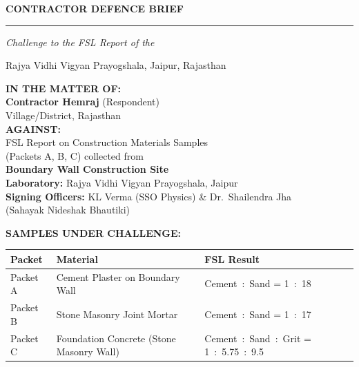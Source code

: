 \documentclass[12pt, a4paper]{article}
\begin{document}

\begin{titlepage}
  \centering
  \vspace*{1.5cm}
  {\Huge\bfseries\color{navy} CONTRACTOR DEFENCE BRIEF\par}
  \vspace{0.4cm}
  {\Large\color{gold} \rule{0.7\linewidth}{1pt}\par}
  \vspace{0.5cm}
  {\large\itshape Challenge to the FSL Report of the\par
  Rajya Vidhi Vigyan Prayogshala, Jaipur, Rajasthan\par}
  \vspace{1cm}

  \begin{mdframed}[linecolor=navy, linewidth=1.5pt, backgroundcolor=lightblue]
    \centering
    \textbf{IN THE MATTER OF:}\\[6pt]
    \large\textbf{Contractor Hemraj} (Respondent)\\
    \normalsize Village/District, Rajasthan\\[10pt]
    \textbf{AGAINST:}\\[6pt]
    FSL Report on Construction Materials Samples\\
    (Packets A, B, C) collected from\\
    \textbf{Boundary Wall Construction Site}\\[10pt]
    \textbf{Laboratory:} Rajya Vidhi Vigyan Prayogshala, Jaipur\\
    \textbf{Signing Officers:} KL Verma (SSO Physics) \& Dr.\ Shailendra Jha\\
    (Sahayak Nideshak Bhautiki)
  \end{mdframed}

  \vspace{1cm}
  \textbf{SAMPLES UNDER CHALLENGE:}

  \begin{center}
  \begin{tabular}{|l|l|l|}
    \hline
    \textbf{Packet} & \textbf{Material} & \textbf{FSL Result} \\
    \hline
    Packet A & Cement Plaster on Boundary Wall & Cement~:~Sand = 1~:~18 \\
    Packet B & Stone Masonry Joint Mortar & Cement~:~Sand = 1~:~17 \\
    Packet C & Foundation Concrete (Stone Masonry Wall) & Cement~:~Sand~:~Grit = 1~:~5.75~:~9.5 \\
    \hline
  \end{tabular}
  \end{center}


\end{titlepage}
\end{document}
